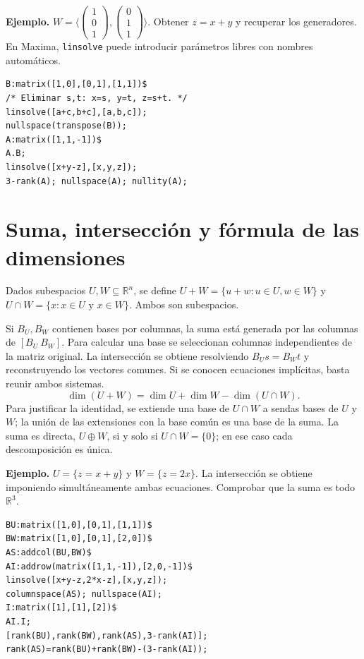 \documentclass[12pt,a4paper]{article}
\begin{document}
\textbf{Ejemplo.} $W=\langle\begin{pmatrix}1\\0\\1\end{pmatrix},\begin{pmatrix}0\\1\\1\end{pmatrix}\rangle$. Obtener $z=x+y$ y recuperar los generadores. En Maxima, \texttt{linsolve} puede introducir parámetros libres con nombres automáticos.
\begin{lstlisting}
B:matrix([1,0],[0,1],[1,1])$
/* Eliminar s,t: x=s, y=t, z=s+t. */
linsolve([a+c,b+c],[a,b,c]);
nullspace(transpose(B));
A:matrix([1,1,-1])$
A.B;
linsolve([x+y-z],[x,y,z]);
3-rank(A); nullspace(A); nullity(A);
\end{lstlisting}
\section{Suma, intersección y fórmula de las dimensiones}
Dados subespacios $U,W\subseteq\mathbb R^n$, se define $U+W=\{u+w:u\in U,w\in W\}$ y $U\cap W=\{x:x\in U\text{ y }x\in W\}$. Ambos son subespacios.

Si $B_U,B_W$ contienen bases por columnas, la suma está generada por las columnas de $[B_U\ B_W]$. Para calcular una base se seleccionan columnas independientes de la matriz original. La intersección se obtiene resolviendo $B_U s=B_W t$ y reconstruyendo los vectores comunes. Si se conocen ecuaciones implícitas, basta reunir ambos sistemas.
\[\boxed{\dim(U+W)=\dim U+\dim W-\dim(U\cap W).}\]
Para justificar la identidad, se extiende una base de $U\cap W$ a sendas bases de $U$ y $W$; la unión de las extensiones con la base común es una base de la suma. La suma es directa, $U\oplus W$, si y solo si $U\cap W=\{0\}$; en ese caso cada descomposición es única.

\textbf{Ejemplo.} $U=\{z=x+y\}$ y $W=\{z=2x\}$. La intersección se obtiene imponiendo simultáneamente ambas ecuaciones. Comprobar que la suma es todo $\mathbb R^3$.
\begin{lstlisting}
BU:matrix([1,0],[0,1],[1,1])$
BW:matrix([1,0],[0,1],[2,0])$
AS:addcol(BU,BW)$
AI:addrow(matrix([1,1,-1]),[2,0,-1])$
linsolve([x+y-z,2*x-z],[x,y,z]);
columnspace(AS); nullspace(AI);
I:matrix([1],[1],[2])$
AI.I;
[rank(BU),rank(BW),rank(AS),3-rank(AI)];
rank(AS)=rank(BU)+rank(BW)-(3-rank(AI));
\end{lstlisting}
\end{document}
